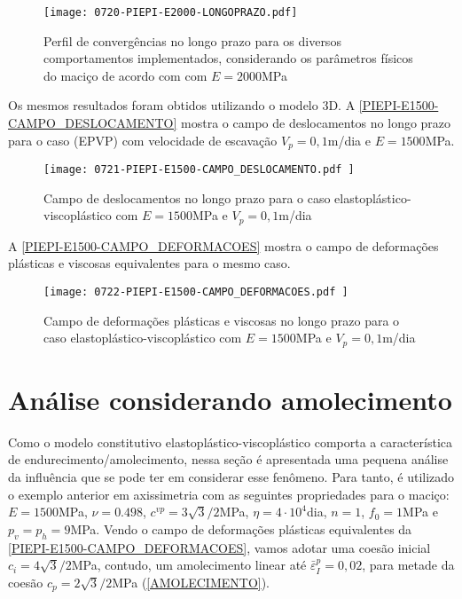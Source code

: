 \begin{figure}[H]
	\begin{center}
		\texttt{[image: 0720-PIEPI-E2000-LONGOPRAZO.pdf]}
	\end{center}
	\caption{\label{PIEPI-E2000-LONGOPRAZO}Perfil de convergências no longo prazo para os diversos comportamentos implementados, considerando os parâmetros físicos do maciço de acordo com  com $E=2000$MPa}
\end{figure}

Os mesmos resultados foram obtidos utilizando o modelo 3D. A \autoref{PIEPI-E1500-CAMPO_DESLOCAMENTO} mostra o campo de deslocamentos no longo prazo para o caso (EPVP) com velocidade de escavação $V_p=0,1$m/dia e $E=1500$MPa.

\begin{figure}[H]
	\begin{center}
		\texttt{[image: 0721-PIEPI-E1500-CAMPO\_DESLOCAMENTO.pdf
		]}
	\end{center}
	\caption{\label{PIEPI-E1500-CAMPO_DESLOCAMENTO}Campo de deslocamentos no longo prazo para o caso elastoplástico-viscoplástico com $E=1500$MPa e $V_p=0,1$m/dia}
\end{figure}

A \autoref{PIEPI-E1500-CAMPO_DEFORMACOES} mostra o campo de deformações plásticas e viscosas equivalentes para o mesmo caso.

\begin{figure}[H]
	\begin{center}
		\texttt{[image: 0722-PIEPI-E1500-CAMPO\_DEFORMACOES.pdf
		]}
	\end{center}
	\caption{\label{PIEPI-E1500-CAMPO_DEFORMACOES}Campo de deformações plásticas e viscosas no longo prazo para o caso elastoplástico-viscoplástico com $E=1500$MPa e $V_p=0,1$m/dia}
\end{figure}


\section{Análise considerando amolecimento}

Como o modelo constitutivo elastoplástico-viscoplástico comporta a característica de endurecimento/amolecimento, nessa seção é apresentada uma pequena análise da influência que se pode ter em considerar esse fenômeno. Para tanto, é utilizado o exemplo anterior em axissimetria com as seguintes propriedades para o maciço: $E=1500$MPa, $\nu=0.498$, $c^{vp}=3\sqrt{3}/2$MPa, $\eta = 4 \cdot 10^4$dia, $n=1$, $f_0=1$MPa e $p_v=p_h=9$MPa. Vendo o campo de deformações plásticas equivalentes da \autoref{PIEPI-E1500-CAMPO_DEFORMACOES}, vamos adotar uma coesão inicial $c_i=4\sqrt{3}/2$MPa, contudo, um amolecimento linear até $\bar \varepsilon^p_{I} = 0,02$, para metade da coesão $c_p=2\sqrt{3}/2$MPa (\autoref{AMOLECIMENTO}).


